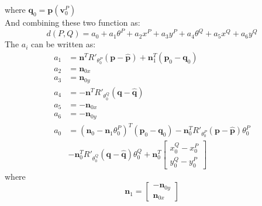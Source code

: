 \documentclass[12pt]{article}
\newcommand{\bn}{\mathbf{n}}
\newcommand{\bq}{\mathbf{q}}
\newcommand{\bp}{\mathbf{p}}
\newcommand{\tq}{\mathbf{\hat{q}}}
\newcommand{\tp}{\mathbf{\hat{p}}}
\newcommand{\bv}{\mathbf{v}}
\begin{document}
where $\bq_0 = \bp(\bv^P_0)$ \\
And combining these two function as:
\begin{equation}
	d(P, Q) = a_0 + a_1\theta^P + a_2x^P + a_3y^P + a_4\theta^Q + a_5x^Q + a_6y^Q
\end{equation}
The $a_i$ can be written as:
\begin{align}
				a_1 &= \bn^TR'_{\theta^P_0} (\bp - \tp) + \bn_1^T(\bp_0 - \bq_0) \\
				a_2 &= \bn_{0x} \\
				a_3 &= \bn_{0y} \\
				a_4 &= -\bn^TR'_{\theta^Q_0} (\bq - \tq) \\
				a_5 &= - \bn_{0x}  \\
				a_6 &= - \bn_{0y}  \\
				a_0 &=  (\bn_0 - \bn_1\theta^P_0)^T(\bp_0 - \bq_0) - \bn_0^TR'_{\theta^P_0} (\bp - \tp)\theta^P_0 \\
				&- \bn_0^TR'_{\theta^Q_0} (\bq - \tq) \theta^Q_0 + \bn_0^T\begin{bmatrix}
	x^Q_0 - x^P_0\\
	 y^Q_0 - y^P_0
	\end{bmatrix} 
\end{align}
where 
\begin{equation}
	\bn_1 = \begin{bmatrix}
		-\bn_{0y}\\
		\bn_{0x}
	\end{bmatrix}
\end{equation} 
\end{document}
